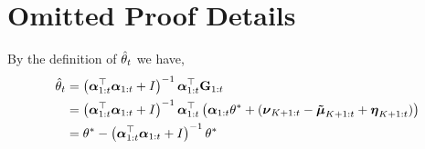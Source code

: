 \section{Omitted Proof Details}

\begin{proposition}

\end{proposition}

\begin{Proof}  By the definition of $\hat{\theta}_t$ we have,
\begin{align*}
    \hat{\theta}_t &= \left(\boldsymbol{\alpha}_{1:t}^{\top}\boldsymbol{\alpha}_{1:t} +  I\right)^{-1} \boldsymbol{\alpha}_{1:t}^{\top} \mathbf{G}_{1:t}\\
    &=\left(\boldsymbol{\alpha}_{1:t}^{\top}\boldsymbol{\alpha}_{1:t} +  I\right)^{-1} \boldsymbol{\alpha}_{1:t}^{\top} \left( \boldsymbol{\alpha}_{1:t} \theta^* + (\boldsymbol{\nu}_{K+1:t} - \boldsymbol{\tilde{\mu}}_{K+1:t} + \boldsymbol{\eta}_{K+1:t})\right)\\
    &= \theta^* - \left(\boldsymbol{\alpha}_{1:t}^{\top}\boldsymbol{\alpha}_{1:t} +  I\right)^{-1}\theta^*
\end{align*}
\end{Proof}